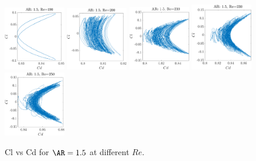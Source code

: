 \begin{figure}
  \centering
  \includegraphics[width=0.24\textwidth]{./fig/nnl/ClCdAR1.5RE190.png}
  \includegraphics[width=0.24\textwidth]{./fig/nnl/ClCdAR1.5RE200.png}  
  \includegraphics[width=0.24\textwidth]{./fig/nnl/ClCdAR1.5RE210.png}
  \includegraphics[width=0.24\textwidth]{./fig/nnl/ClCdAR1.5RE230.png}
  \includegraphics[width=0.24\textwidth]{./fig/nnl/ClCdAR1.5RE250.png}
  \caption{Cl vs Cd for $\AR=1.5$ at different $Re$.}
  \label{fig:ClCd}
\end{figure}

